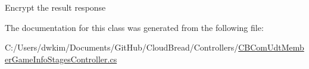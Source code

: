 Encrypt the result response 

The documentation for this class was generated from the following file\+:\begin{DoxyCompactItemize}
\item 
C\+:/\+Users/dwkim/\+Documents/\+Git\+Hub/\+Cloud\+Bread/\+Controllers/\hyperlink{a00136}{C\+B\+Com\+Udt\+Member\+Game\+Info\+Stages\+Controller.\+cs}\end{DoxyCompactItemize}
